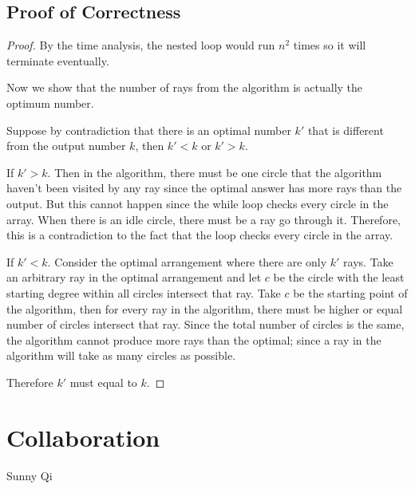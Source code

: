 \documentclass[11pt, oneside]{article}   	%
\begin{document}
\subsection{Proof of Correctness}
\begin{proof}
By the time analysis, the nested loop would run $n^2$ times so it will terminate eventually.

Now we show that the number of rays from the algorithm is actually the optimum number.

Suppose by contradiction that there is an optimal number $k'$ that is different from the output number $k$, then $k'<k$ or $k'>k$.

If $k'>k$. Then in the algorithm, there must be one circle that the algorithm haven't been visited by any ray since the optimal answer has more rays than the output. But this cannot happen since the while loop checks every circle in the array. When there is an idle circle, there must be a ray go through it. Therefore, this is a contradiction to the fact that the loop checks every circle in the array.

If $k'<k$. Consider the optimal arrangement where there are only $k'$ rays. Take an arbitrary ray in the optimal arrangement and let $c$ be the circle with the least starting degree within all circles intersect that ray. Take $c$ be the starting point of the algorithm, then for every ray in the algorithm, there must be higher or equal number of circles intersect that ray. Since the total number of circles is the same, the algorithm cannot produce more rays than the optimal; since a ray in the algorithm will take as many circles as possible.

Therefore $k'$ must equal to $k$.
\end{proof}

\section{Collaboration}
Sunny Qi
\end{document}

